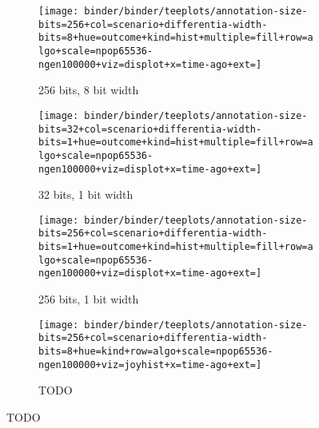 \begin{figure*}
  \centering

\begin{subfigure}[b]{0.4\textwidth}
\centering
\texttt{[image: binder/binder/teeplots/annotation-size-bits=256+col=scenario+differentia-width-bits=8+hue=outcome+kind=hist+multiple=fill+row=algo+scale=npop65536-ngen100000+viz=displot+x=time-ago+ext=]}
\caption{256 bits, 8 bit width}
\end{subfigure}%
\begin{subfigure}[b]{0.6\textwidth}
\centering
\texttt{[image: binder/binder/teeplots/annotation-size-bits=32+col=scenario+differentia-width-bits=1+hue=outcome+kind=hist+multiple=fill+row=algo+scale=npop65536-ngen100000+viz=displot+x=time-ago+ext=]}
\caption{32 bits, 1 bit width}
\end{subfigure}

\begin{subfigure}[b]{0.4\textwidth}
  \centering
  \texttt{[image: binder/binder/teeplots/annotation-size-bits=256+col=scenario+differentia-width-bits=1+hue=outcome+kind=hist+multiple=fill+row=algo+scale=npop65536-ngen100000+viz=displot+x=time-ago+ext=]}
  \caption{256 bits, 1 bit width}
  \end{subfigure}%
  \begin{subfigure}[b]{0.6\textwidth}
    \flushright
    \texttt{[image: binder/binder/teeplots/annotation-size-bits=256+col=scenario+differentia-width-bits=8+hue=kind+row=algo+scale=npop65536-ngen100000+viz=joyhist+x=time-ago+ext=]}
    \caption{TODO}
  \end{subfigure}%
  \caption{TODO}
  \label{fig:recency-structure}

\end{figure*}
